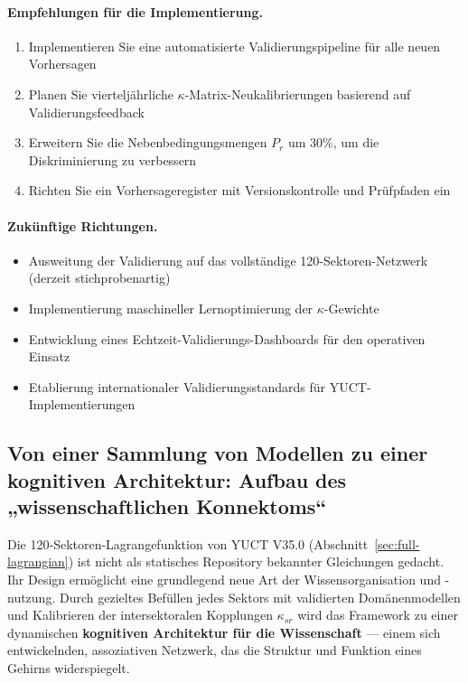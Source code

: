 \documentclass[13pt,a4paper]{article}
\begin{document}
	\paragraph{Empfehlungen für die Implementierung.}
	\begin{enumerate}[leftmargin=*]
		\item Implementieren Sie eine automatisierte Validierungspipeline für alle neuen Vorhersagen
		\item Planen Sie vierteljährliche $\kappa$-Matrix-Neukalibrierungen basierend auf Validierungsfeedback
		\item Erweitern Sie die Nebenbedingungsmengen $P_r$ um 30\%, um die Diskriminierung zu verbessern
		\item Richten Sie ein Vorhersageregister mit Versionskontrolle und Prüfpfaden ein
	\end{enumerate}
	
	\paragraph{Zukünftige Richtungen.}
	\begin{itemize}
		\item Ausweitung der Validierung auf das vollständige 120-Sektoren-Netzwerk (derzeit stichprobenartig)
		\item Implementierung maschineller Lernoptimierung der $\kappa$-Gewichte
		\item Entwicklung eines Echtzeit-Validierungs-Dashboards für den operativen Einsatz
		\item Etablierung internationaler Validierungsstandards für YUCT-Implementierungen
	\end{itemize}
	
	\subsection{Von einer Sammlung von Modellen zu einer kognitiven Architektur:
		Aufbau des „wissenschaftlichen Konnektoms“}
	\label{subsec:cognitive-architecture}
	
	Die 120‑Sektoren-Lagrangefunktion von YUCT V35.0 (Abschnitt~\ref{sec:full-lagrangian})
	ist nicht als statisches Repository bekannter Gleichungen gedacht. Ihr Design ermöglicht
	eine grundlegend neue Art der Wissensorganisation und -nutzung. Durch gezieltes
	Befüllen jedes Sektors mit validierten Domänenmodellen und Kalibrieren der
	intersektoralen Kopplungen \(\kappa_{sr}\) wird das Framework zu einer dynamischen
	\textbf{kognitiven Architektur für die Wissenschaft} — einem sich entwickelnden, assoziativen Netzwerk,
	das die Struktur und Funktion eines Gehirns widerspiegelt.
	
\end{document}
